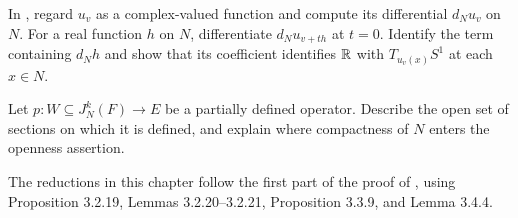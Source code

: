 \begin{exercise}
In , regard $u_v$ as a
complex-valued function and compute its differential $d_Nu_v$ on $N$.
For a real function $h$ on $N$, differentiate $d_Nu_{v+th}$ at
$t=0$. Identify the term containing $d_Nh$ and show that its
coefficient identifies $\mathbb{R}$ with $T_{u_v(x)}S^1$ at each $x\in N$.
\end{exercise}

\begin{exercise}
Let $p\colon W\subseteq J_N^k(F)\to E$ be a partially defined
operator. Describe the open set of sections on which it is defined,
and explain where compactness of $N$ enters the openness assertion.
\end{exercise}

The reductions in this chapter follow the first part of the proof of
\cite[Theorem~3.4.3, pp.~66--67]{Steffens_Representability_Elliptic_Moduli},
using Proposition 3.2.19, Lemmas 3.2.20--3.2.21, Proposition 3.3.9,
and Lemma 3.4.4.
